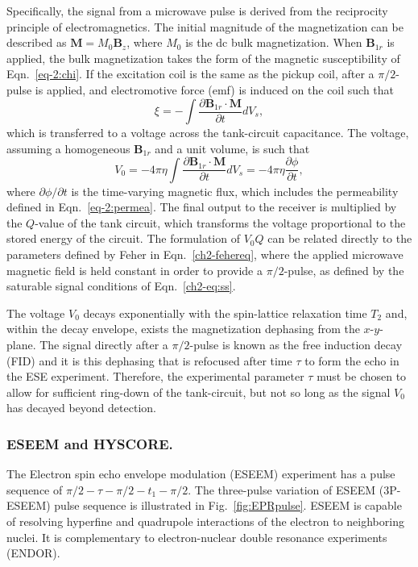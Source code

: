 Specifically, the signal from a microwave pulse is derived from the reciprocity principle of electromagnetics. \cite{HOULT2011329} The initial magnitude of the magnetization can be described as $\mathbf{M} = M_0 \mathbf{B}_z$, where $M_0$ is the dc bulk magnetization. When $\mathbf{B}_{1r}$ is applied, the bulk magnetization takes the form of the magnetic susceptibility of Eqn.~\ref{eq-2:chi}. If the excitation coil is the same as the pickup coil, after a $\pi/2$-pulse is applied, and electromotive force (emf) is induced on the coil such that 
\begin{equation}
    \xi = - \int \frac{\partial \mathbf{B}_{1r} \cdot \mathbf{M}}{\partial t} dV_s,
\end{equation}
which is transferred to a voltage across the tank-circuit capacitance. The voltage, assuming a homogeneous $\mathbf{B}_{1r}$ and a unit volume, is such that
\begin{equation}
    V_0 = - 4\pi \eta \int \frac{\partial \mathbf{B}_{1r} \cdot \mathbf{M}}{\partial t} dV_s = - 4 \pi \eta \frac{\partial \phi}{\partial t},
\end{equation}
where $\partial \phi/\partial t$ is the time-varying magnetic flux, which includes the permeability defined in Eqn.~\ref{eq-2:permea}. \cite{schumacher1970introduction,slichter1978principles,HOULT2011329} The final output to the receiver is multiplied by the $Q$-value of the tank circuit, which transforms the voltage proportional to the stored energy of the circuit. \cite{ramo1984fields} The formulation of $V_0 Q$ can be related directly to the parameters defined by Feher in Eqn.~\ref{ch2-fehereq}, where the applied microwave magnetic field is held constant in order to provide a $\pi/2$-pulse, as defined by the saturable signal conditions of Eqn.~\ref{ch2-eq:ss}.

The voltage $V_0$ decays exponentially with the spin-lattice relaxation time $T_2$ and, within the decay envelope, exists the magnetization dephasing from the $x$-$y$-plane. The signal directly after a $\pi/2$-pulse is known as the free induction decay (FID) and it is this dephasing that is refocused after time $\tau$ to form the echo in the ESE experiment. Therefore, the experimental parameter $\tau$ must be chosen to allow for sufficient ring-down of the tank-circuit, but not so long as the signal $V_0$ has decayed beyond detection.

\subsubsection*{ESEEM and HYSCORE.}
The Electron spin echo envelope modulation (ESEEM) experiment has a  pulse sequence of ${\pi/2\!-\!\tau\!-\!\pi/2\!-\!t_1\!-\!\pi/2}$. The three-pulse variation of ESEEM (3P-ESEEM) pulse sequence is illustrated in Fig.~\ref{fig:EPRpulse}. ESEEM is capable of resolving hyperfine and quadrupole interactions of the electron to neighboring nuclei. It is complementary to electron-nuclear double resonance experiments (ENDOR). \cite{schweiger2001principles,Doorslaer2007,Harmer2009,CUTSAIL20151370}

